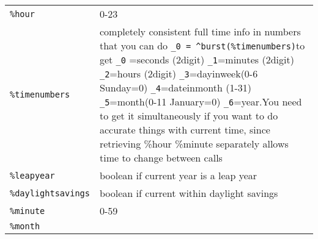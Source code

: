\documentclass[]{article}
\begin{document}
\begin{longtable}[]{@{}ll@{}}
\begin{minipage}[t]{0.12\columnwidth}\raggedright\strut
\texttt{\%hour}\strut
\end{minipage} & \begin{minipage}[t]{0.61\columnwidth}\raggedright\strut
0-23\strut
\end{minipage}\tabularnewline
\begin{minipage}[t]{0.12\columnwidth}\raggedright\strut
\texttt{\%timenumbers}\strut
\end{minipage} & \begin{minipage}[t]{0.61\columnwidth}\raggedright\strut
completely consistent full time info in numbers that you can do
\texttt{\_0\ =\ \^{}burst(\%timenumbers)}to get \texttt{\_0} =seconds
(2digit) \texttt{\_1}=minutes (2digit) \texttt{\_2}=hours (2digit)
\texttt{\_3}=dayinweek(0-6 Sunday=0) \texttt{\_4}=dateinmonth (1-31)
\texttt{\_5}=month(0-11 January=0) \texttt{\_6}=year.You need to get it
simultaneously if you want to do accurate things with current time,
since retrieving \%hour \%minute separately allows time to change
between calls\strut
\end{minipage}\tabularnewline
\begin{minipage}[t]{0.12\columnwidth}\raggedright\strut
\texttt{\%leapyear}\strut
\end{minipage} & \begin{minipage}[t]{0.61\columnwidth}\raggedright\strut
boolean if current year is a leap year\strut
\end{minipage}\tabularnewline
\begin{minipage}[t]{0.12\columnwidth}\raggedright\strut
\texttt{\%daylightsavings}\strut
\end{minipage} & \begin{minipage}[t]{0.61\columnwidth}\raggedright\strut
boolean if current within daylight savings\strut
\end{minipage}\tabularnewline
\begin{minipage}[t]{0.12\columnwidth}\raggedright\strut
\texttt{\%minute}\strut
\end{minipage} & \begin{minipage}[t]{0.61\columnwidth}\raggedright\strut
0-59\strut
\end{minipage}\tabularnewline
\begin{minipage}[t]{0.12\columnwidth}\raggedright\strut
\texttt{\%month}\strut
\end{minipage} & \begin{minipage}[t]{0.61\columnwidth}\raggedright\strut

\end{minipage}
\end{longtable}
\end{document}
